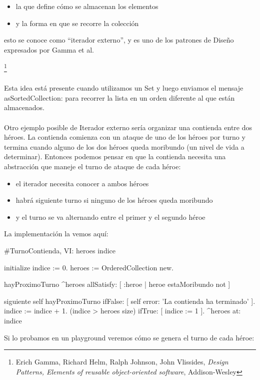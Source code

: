 \documentclass[a4paper,12pt]{book}
\begin{document}
\begin{itemize}
 \item la que define cómo se almacenan los elementos
 \item y la forma en que se recorre la colección
\end{itemize}

esto se conoce como ``iterador externo'', y es uno de los patrones de Diseño expresados por Gamma et al.{\footnote{
Erich Gamma, Richard Helm, Ralph Johnson, John Vlissides, \textit{Design Patterns, Elements of reusable 
object-oriented software}, Addison-Wesley}
\\
\\
Esta idea está presente cuando utilizamos un Set y luego enviamos el mensaje asSortedCollection: para recorrer
la lista en un orden diferente al que están almacenados. 
\\
\\
Otro ejemplo posible de Iterador externo sería organizar una contienda entre dos héroes. La contienda comienza
con un ataque de uno de los héroes por turno y termina cuando alguno de los dos héroes queda moribundo
(un nivel de vida a determinar). Entonces podemos pensar en que la contienda necesita una abstracción que
maneje el turno de ataque de cada héroe:

\begin{itemize}
 \item el iterador necesita conocer a ambos héroes
 \item habrá siguiente turno si ninguno de los héroes queda moribundo
 \item y el turno se va alternando entre el primer y el segundo héroe
\end{itemize}

La implementación la vemos aquí:

\begin{code}
#TurnoContienda, VI: heroes indice

initialize
   indice := 0.
   heroes := OrderedCollection new.
   
hayProximoTurno
   ^heroes allSatisfy: [ :heroe | heroe estaMoribundo not ]
   
siguiente
   self hayProximoTurno 
        ifFalse: [ self error: 'La contienda ha terminado' ].
   indice := indice + 1.
   (indice > heroes size) ifTrue: [ indice := 1 ].
   ^heroes at: indice
\end{code}

\vspace{\baselineskip}
Si lo probamos en un playground veremos cómo se genera el turno de cada héroe:

}
\end{document}

